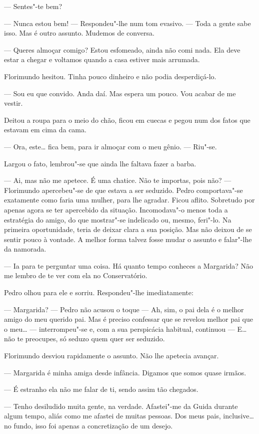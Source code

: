--- Sentes"-te bem?

--- Nunca estou bem! --- Respondeu"-lhe num tom evasivo. --- Toda a gente sabe
isso. Mas é outro assunto. Mudemos de conversa.

--- Queres almoçar comigo? Estou esfomeado, ainda não comi nada. Ela deve
estar a chegar e voltamos quando a casa estiver mais arrumada.

Florimundo hesitou. Tinha pouco dinheiro e não podia desperdiçá-lo.

--- Sou eu que convido. Anda daí. Mas espera um pouco. Vou acabar de me
vestir.

Deitou a roupa para o meio do chão, ficou em cuecas e pegou num dos
fatos que estavam em cima da cama.

--- Ora, este\ldots{} fica bem, para ir almoçar com o meu gênio. --- Riu"-se.

Largou o fato, lembrou"-se que ainda lhe faltava fazer a barba.

--- Ai, mas não me apetece. É uma chatice. Não te importas, pois não? ---
Florimundo apercebeu"-se de que estava a ser seduzido. Pedro
comportava"-se exatamente como faria uma mulher, para lhe agradar. Ficou
aflito. Sobretudo por apenas agora se ter apercebido da situação.
Incomodava"-o menos toda a estratégia do amigo, do que mostrar"-se
indelicado ou, mesmo, feri"-lo. Na primeira oportunidade, teria de deixar
clara a sua posição. Mas não deixou de se sentir pouco à vontade. A
melhor forma talvez fosse mudar o assunto e falar"-lhe da namorada.

--- Ia para te perguntar uma coisa. Há quanto tempo conheces a Margarida?
Não me lembro de te ver com ela no Conservatório.

Pedro olhou para ele e sorriu. Respondeu"-lhe imediatamente:

--- Margarida? --- Pedro não acusou o toque --- Ah, sim, o pai dela é o melhor
amigo do meu querido pai. Mas é preciso confessar que se revelou melhor
pai que o meu\ldots{} --- interrompeu"-se e, com a sua perspicácia habitual,
continuou ---  E\ldots{} não te preocupes, só seduzo quem quer ser
seduzido.

Florimundo desviou rapidamente o assunto. Não lhe apetecia avançar.

--- Margarida é minha amiga desde infância. Digamos que somos quase
irmãos.

--- É estranho ela não me falar de ti, sendo assim tão chegados.

--- Tenho desiludido muita gente, na verdade. Afastei"-me da Guida durante
algum tempo, aliás como me afastei de muitas pessoas. Dos meus pais,
inclusive\ldots{} no fundo, isso foi apenas a concretização de um desejo.

